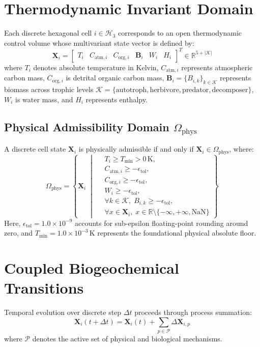 \documentclass[10pt,twocolumn,letterpaper]{article}
\begin{document}
\section{Thermodynamic Invariant Domain}
Each discrete hexagonal cell $i \in \mathcal{H}_3$ corresponds to an open thermodynamic control volume whose multivariant state vector is defined by:
\begin{equation}
\mathbf{X}_i = \begin{bmatrix} T_i & C_{\text{atm}, i} & C_{\text{org}, i} & \mathbf{B}_i & W_i & H_i \end{bmatrix}^T \in \mathbb{R}^{5 + |\mathcal{K}|}
\end{equation}
where $T_i$ denotes absolute temperature in Kelvin, $C_{\text{atm}, i}$ represents atmospheric carbon mass, $C_{\text{org}, i}$ is detrital organic carbon mass, $\mathbf{B}_i = \{ B_{i, k} \}_{k \in \mathcal{K}}$ represents biomass across trophic levels $\mathcal{K} = \{\text{autotroph}, \text{herbivore}, \text{predator}, \text{decomposer}\}$, $W_i$ is water mass, and $H_i$ represents enthalpy.

\subsection{Physical Admissibility Domain $\Omega_{\text{phys}}$}
A discrete cell state $\mathbf{X}_i$ is physically admissible if and only if $\mathbf{X}_i \in \Omega_{\text{phys}}$, where:
\begin{equation}
\Omega_{\text{phys}} = \left\{ \mathbf{X}_i \;\middle|\;
\begin{aligned}
& T_i \ge T_{\min} > 0\,\text{K}, \\
& C_{\text{atm}, i} \ge -\epsilon_{\text{tol}}, \\
& C_{\text{org}, i} \ge -\epsilon_{\text{tol}}, \\
& W_i \ge -\epsilon_{\text{tol}}, \\
& \forall k \in \mathcal{K}, \; B_{i, k} \ge -\epsilon_{\text{tol}}, \\
& \forall x \in \mathbf{X}_i, \; x \in \mathbb{R} \setminus \{-\infty, +\infty, \text{NaN}\}
\end{aligned}
\right\}
\end{equation}
Here, $\epsilon_{\text{tol}} = 1.0 \times 10^{-9}$ accounts for sub-epsilon floating-point rounding around zero, and $T_{\min} = 1.0 \times 10^{-3}\,\text{K}$ represents the foundational physical absolute floor.

\section{Coupled Biogeochemical Transitions}
Temporal evolution over discrete step $\Delta t$ proceeds through process summation:
\begin{equation}
\mathbf{X}_i(t + \Delta t) = \mathbf{X}_i(t) + \sum_{p \in \mathcal{P}} \Delta \mathbf{X}_{i, p}
\end{equation}
where $\mathcal{P}$ denotes the active set of physical and biological mechanisms.
\end{document}
